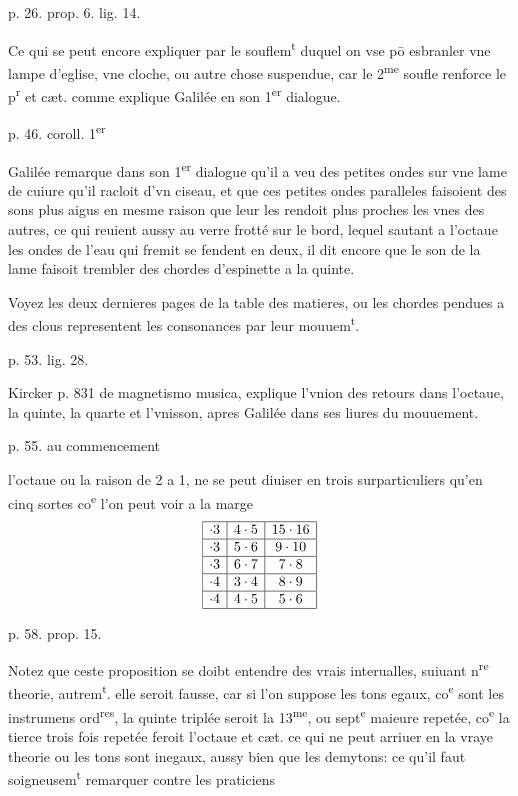 \documentclass[11pt,a4paper]{article}
\begin{document}
p. 26. prop. 6. lig. 14.

Ce qui se peut encore expliquer par le souflem\textsuperscript{t} duquel on vse pō esbranler vne lampe d'eglise, vne cloche, ou autre chose suspendue, car le 2\textsuperscript{me} soufle renforce le p\textsuperscript{r} et cæt. comme explique Galilée en son 1\textsuperscript{er} dialogue.

p. 46. coroll. 1\textsuperscript{er}

Galilée remarque dans son 1\textsuperscript{er} dialogue qu'il a veu des petites ondes sur vne lame de cuiure qu'il racloit d'vn ciseau, et que ces petites ondes paralleles faisoient des sons plus aigus en mesme raison que leur  les rendoit plus proches les vnes des autres, ce qui reuient aussy au verre frotté sur le bord, lequel sautant a l'octaue les ondes de l'eau qui fremit se fendent en deux, il dit encore que le son de la lame faisoit trembler des chordes d'espinette a la quinte.

Voyez les deux dernieres pages de la table des matieres, ou les chordes pendues a des clous representent les consonances par leur mouuem\textsuperscript{t}.

p. 53. lig. 28.

Kircker p. 831 de magnetismo musica, explique l'vnion des retours dans l'octaue, la quinte, la quarte et l'vnisson, apres Galilée dans ses liures du mouuement.

p. 55. au commencement

l'octaue ou la raison de 2 a 1, ne se peut diuiser en trois surparticuliers qu'en cinq sortes co\textsuperscript{e} l'on peut voir a la marge
\[
\begin{array}{|c|c|c|}
\hline
\cdot 3 & 4\cdot 5 & 15\cdot 16 \\ \hline
\cdot 3 & 5\cdot 6 & 9\cdot 10 \\ \hline
\cdot 3 & 6\cdot 7 & 7\cdot 8 \\ \hline
\cdot 4 & 3\cdot 4 & 8\cdot 9 \\ \hline
\cdot 4 & 4\cdot 5 & 5\cdot 6 \\ \hline
\end{array}
\]

p. 58. prop. 15.

Notez que ceste proposition se doibt entendre des vrais interualles, suiuant n\textsuperscript{re} theorie, autrem\textsuperscript{t}. elle seroit fausse, car si l'on suppose les tons egaux, co\textsuperscript{e} sont les instrumens ord\textsuperscript{res}, la quinte triplée seroit la 13\textsuperscript{me}, ou sept\textsuperscript{e} maieure repetée, co\textsuperscript{e} la tierce trois fois repetée feroit l'octaue et cæt. ce qui ne peut arriuer en la vraye theorie ou les tons sont inegaux, aussy bien que les demytons: ce qu'il faut soigneusem\textsuperscript{t} remarquer contre les praticiens
\end{document}
